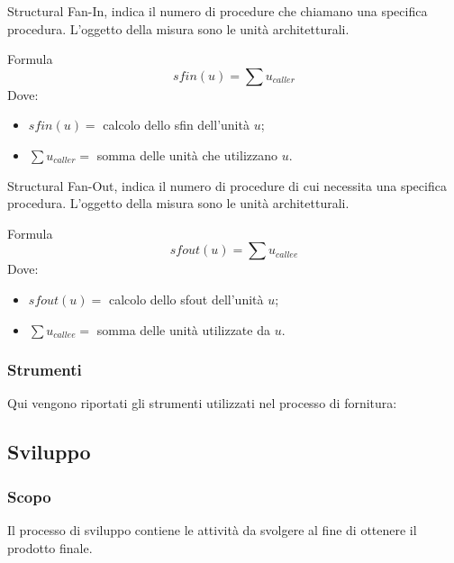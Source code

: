 Structural Fan-In, indica il numero di procedure che chiamano una specifica 
procedura. L'oggetto della misura sono le unità architetturali.
\par{Formula}
\begin{displaymath}
  sfin(u) =  \sum u_{caller}
\end{displaymath}
Dove:
\begin{itemize}
  \item[] $sfin(u) =$ calcolo dello sfin dell'unità $u$;
  \item[] $\sum u_{caller} =$ somma delle unità che utilizzano $u$.
\end{itemize}

Structural Fan-Out, indica il numero di procedure di cui necessita una 
specifica procedura. L'oggetto della misura sono le unità architetturali. 
\par{Formula}
\begin{displaymath}
  sfout(u) = \sum u_{callee}
\end{displaymath}
Dove:
\begin{itemize}
  \item[] $sfout(u) =$ calcolo dello sfout dell'unità $u$;
  \item[] $\sum u_{callee} =$ somma delle unità utilizzate da $u$.
\end{itemize}
			\subsubsection{Strumenti}
			Qui vengono riportati gli strumenti utilizzati nel processo di fornitura:
			
		\subsection{Sviluppo}
		\subsubsection{Scopo}
		Il processo di sviluppo contiene le attività da svolgere al fine di ottenere il prodotto finale.
